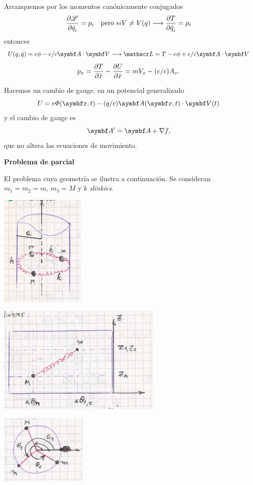 \documentclass[10pt,oneside]{CBFT_book}
\begin{document}
Arranquemos por los momentos canónicamente conjugados
\[
	\frac{\partial^{\hspace{-0.05em}} {\mathscr{L}}}{\partial {\dot{q}_i}^{\hspace{-0.05em}}} = p_i \quad \textrm{pero} \; si V \neq V(q) \longrightarrow \frac{\partial^{\hspace{-0.05em}} {T}}{\partial {\dot{q}_i}^{\hspace{-0.05em}}} = p_i
\]
entonces
\[
	U(q,\dot{q}) =  e \phi - e/c \vb{A}\cdot\vb{V} \longrightarrow \Lag = T - e \phi + e/c  \vb{A}\cdot\vb{V}
\]
\[
	p_x = \frac{\partial^{\hspace{-0.05em}} {T}}{\partial {\dot{x}}^{\hspace{-0.05em}}} - \frac{\partial^{\hspace{-0.05em}} {U}}{\partial {\dot{x}}^{\hspace{-0.05em}}} = m V_x - (e/c) A_x.
\]

Hacemos un cambio de gauge, en un potencial generalizado
\[
	U =  e \Phi(\vb{x},t) - (q/c) \vb{A}(\vb{x},t)\cdot\vb{V}(t)
\]
y el cambio de gauge es
\[
	\vb{A}' = \vb{A} + \nabla f,
\]
que no altera las ecuaciones de movimiento.


\begin{ejemplo}{\bf Problema de parcial}

El problema cuya geometría se ilustra a continuación. Se consideran $m_1 = m_2 = m$, $m_3 = M$ y  $k$ {\it slinkies}.

\includegraphics[scale=0.5]{images/fig_mc_problema_parcial_osc_0.jpg}
 
\includegraphics[scale=0.5]{images/fig_mc_problema_parcial_osc_1.jpg}

\includegraphics[scale=0.5]{images/fig_mc_problema_parcial_osc_2.jpg}


\end{ejemplo}
\end{document}
